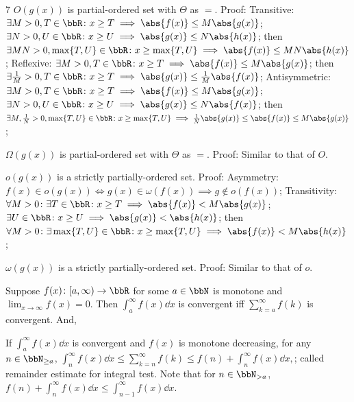 \documentclass[a4paper,10pt]{extarticle}
\begin{document}
\begin{multicols}{7}
$O(g(x))$ is partial-ordered set with $\Theta$ as $=$.
Proof:
Transitive:
\(\exists M>0,T\in\bbR\colon x\ge T\implies\abs{f(x)}\le M\abs{g(x)}\); 
\(\exists N>0,U\in\bbR\colon x\ge U\implies\abs{g(x)}\le N\abs{h(x)}\); 
then
\(\exists MN>0,\max\{T,U\}\in\bbR\colon x\ge\max\{T,U\}\implies\abs{f(x)}\le MN\abs{h(x)}\); 
Reflexive:
\(\exists M>0,T\in\bbR\colon x\ge T\implies\abs{f(x)}\le M\abs{g(x)}\); 
then
\(\exists \frac{1}{M}>0,T\in\bbR\colon x\ge T\implies\abs{g(x)}\le \frac{1}{M}\abs{f(x)}\); 
Antisymmetric:
\(\exists M>0,T\in\bbR\colon x\ge T\implies\abs{f(x)}\le M\abs{g(x)}\); 
\(\exists N>0,U\in\bbR\colon x\ge U\implies\abs{g(x)}\le N\abs{f(x)}\); 
then
\(\exists M,\frac{1}{N}>0,\max\{T,U\}\in\bbR\colon x\ge \max\{T,U\}\implies\frac{1}{N}\abs{g(x)}\le\abs{f(x)}\le M\abs{g(x)}\); 


$\Omega(g(x))$ is partial-ordered set with $\Theta$ as $=$.
Proof:
Similar to that of $O$.


$o(g(x))$ is a strictly partially-ordered set.
Proof:
Asymmetry:
\(f(x)\in o(g(x))\iff g(x)\in\omega(f(x))\implies g\notin o(f(x))\); 
Transitivity:
\(\forall M>0\colon\exists T\in\bbR\colon x\ge T\implies\abs{f(x)}<M\abs{g(x)}\); 
\(\exists U\in\bbR\colon x\ge U\implies\abs{g(x)}<\abs{h(x)}\); 
then
\(\forall M>0\colon\exists \max\{T,U\}\in\bbR\colon x\ge \max\{T,U\}\implies\abs{f(x)}<M\abs{h(x)}\); 


$\omega(g(x))$ is a strictly partially-ordered set.
Proof:
Similar to that of $o$.



Suppose $f(x)\colon[a,\infty)\to\bbR$ for some $a\in\bbN$ is monotone and $\lim_{x\to\infty}f(x)=0$. Then $\int_a^{\infty}f(x)\dd{x}$ is convergent iff $\sum_{k=a}^{\infty}f(k)$ is convergent. And,

If $\int_a^{\infty}f(x)\dd{x}$ is convergent and $f(x)$ is monotone decreasing, for any $n\in\bbN_{\ge a}$,
\(\int_n^{\infty}f(x)\dd{x}\le\sum_{k=n}^{\infty}f(k)\le f(n)+\int_n^{\infty}f(x)\dd{x},\); 
called remainder estimate for integral test. Note that for $n\in\bbN_{>a}$, $f(n)+\int_n^{\infty}f(x)\dd{x}\le\int_{n-1}^{\infty}f(x)\dd{x}$.


\end{multicols}
\end{document}
